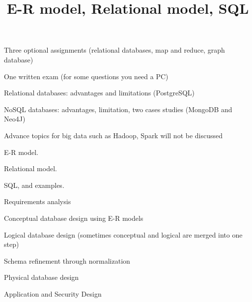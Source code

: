 \documentclass{beamer}
\title{E-R model, Relational model, SQL}
\author{ }
\institute{Hogeschool Rotterdam \\ 
Rotterdam, Netherlands}
\date{}
\begin{document}
\maketitle



\begin{slide}{
\item Three optional assignments (relational databases, map and reduce, graph database)
\item One written exam (for some questions you need a PC)
}\end{slide}

\begin{slide}{
\item Relational databases: advantages and limitations (PostgreSQL)
\item NoSQL databases: advantages, limitation, two cases studies (MongoDB and Neo4J)  
\item Advance topics for big data such as Hadoop, Spark will not be discussed
}\end{slide}


\begin{slide}{
\item E-R model.
\item Relational model.
\item SQL, and examples.
}\end{slide}

\begin{slide}{
\item Requirements analysis 
\pause
\item Conceptual database design using E-R models
\pause
\item Logical database design (sometimes conceptual and logical are merged into one step) 
\pause
\item Schema refinement through normalization
\pause
\item Physical database design
\pause
\item Application and Security Design
}\end{slide}
\end{document}
